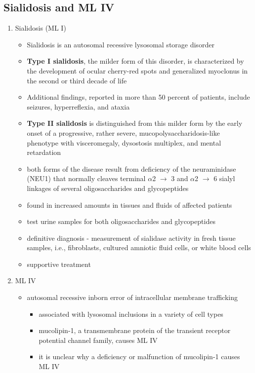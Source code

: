 \documentclass{scrartcl}
\begin{document}
\subsection{Sialidosis and ML IV}
\label{sec:org39ed891}

\begin{enumerate}
\item Sialidosis (ML I)
\label{sec:orga6620b4}
\begin{itemize}
\item Sialidosis is an autosomal recessive lysosomal storage disorder

\item \textbf{Type I sialidosis}, the milder form of this disorder, is
characterized by the development of ocular cherry-red spots and
generalized myoclonus in the second or third decade of life
\item Additional findings, reported in more than 50 percent of patients,
include seizures, hyperreflexia, and ataxia

\item \textbf{Type II sialidosis} is distinguished from this milder form by the
early onset of a progressive, rather severe,
mucopolysaccharidosis-like phenotype with visceromegaly, dysostosis
multiplex, and mental retardation

\item both forms of the disease result from deficiency of the
neuraminidase (NEU1) that normally cleaves terminal \(\alpha\)2 \(\to\) 3 and
\(\alpha\)2 \(\to\) 6 sialyl linkages of several oligosaccharides and glycopeptides

\item found in increased amounts in tissues and fluids of affected patients

\item test urine samples for both oligosaccharides and glycopeptides

\item definitive diagnosis - measurement of sialidase activity in fresh tissue
samples, i.e., fibroblasts, cultured amniotic fluid cells, or white
blood cells

\item supportive treatment
\end{itemize}

\item ML IV
\label{sec:orgb5d00fe}

\begin{itemize}
\item autosomal recessive inborn error of intracellular membrane trafficking
\begin{itemize}
\item associated with lysosomal inclusions in a variety of cell types
\item mucolipin-1, a transmembrane protein of the transient receptor
potential channel family, causes ML IV
\item it is unclear why a deficiency or malfunction of mucolipin-1 causes ML IV
\end{itemize}


\end{itemize}
\end{enumerate}
\end{document}
